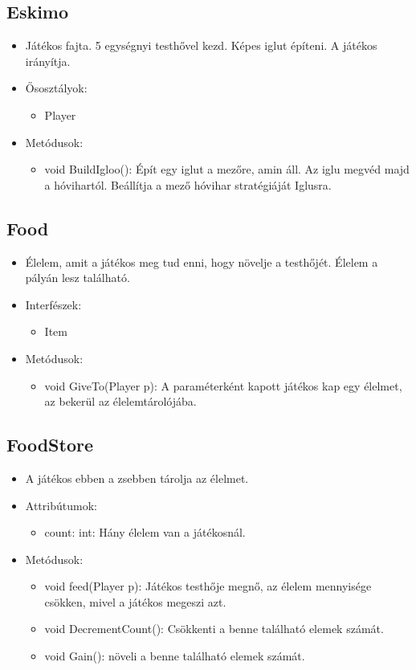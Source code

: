 \subsection{Eskimo}
\begin{itemize}
	\item Játékos fajta. 5 egységnyi testhővel kezd. Képes iglut építeni. A játékos irányítja.
	\item Ősosztályok:
	\begin{itemize}
		\item Player
	\end{itemize}
	\item Metódusok:
	\begin{itemize}
		\item void BuildIgloo(): Épít egy iglut a mezőre, amin áll. Az iglu megvéd majd a hóvihartól. Beállítja a mező hóvihar stratégiáját Iglusra.
	\end{itemize}
\end{itemize}

\subsection{Food}
\begin{itemize}
	\item Élelem, amit a játékos meg tud enni, hogy növelje a testhőjét. Élelem a pályán lesz található.
	\item Interfészek:
	\begin{itemize}
		\item Item
	\end{itemize}
	\item Metódusok:
	\begin{itemize}
		\item void GiveTo(Player p): A paraméterként kapott játékos kap egy élelmet, az bekerül az élelemtárolójába.
	\end{itemize}
\end{itemize}

\subsection{FoodStore}
\begin{itemize}
	\item A játékos ebben a zsebben tárolja az élelmet.
	\item Attribútumok:
	\begin{itemize}
		\item count: int: Hány élelem van a játékosnál.
	\end{itemize}
	\item Metódusok:
	\begin{itemize}
		\item void feed(Player p): Játékos testhője megnő, az élelem mennyisége csökken, mivel a játékos megeszi azt.
		\item void DecrementCount(): Csökkenti a benne található elemek számát.
		\item void Gain(): növeli a benne található elemek számát.
	\end{itemize}
\end{itemize}

